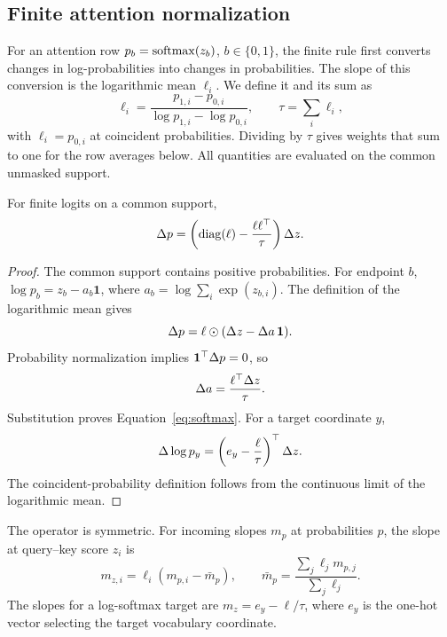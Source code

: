 \subsection{Finite attention normalization}
\label{app:softmax}
For an attention row $p_b=\operatorname{softmax}(z_b)$, $b\in\{0,1\}$, the finite rule first converts changes in log-probabilities into changes in probabilities. The slope of this conversion is the logarithmic mean $\ell_i$. We define it and its sum as
\begin{equation}
\ell_i=\frac{p_{1,i}-p_{0,i}}{\log p_{1,i}-\log p_{0,i}},\qquad
\tau=\sum_i\ell_i,
\label{eq:logmean}
\end{equation}
with $\ell_i=p_{0,i}$ at coincident probabilities. Dividing by $\tau$ gives weights that sum to one for the row averages below. All quantities are evaluated on the common unmasked support.
\begin{proposition}
For finite logits on a common support,
\begin{equation}
\Delta p=\left(\operatorname{diag}(\ell)-\frac{\ell\ell^\top}{\tau}\right)\Delta z.
\label{eq:softmax}
\end{equation}
\end{proposition}
\begin{proof}
The common support contains positive probabilities. For endpoint $b$, $\log p_b=z_b-a_b\mathbf 1$, where $a_b=\log\sum_i\exp(z_{b,i})$. The definition of the logarithmic mean gives
\begin{equation}
\Delta p=\ell\odot(\Delta z-\Delta a\,\mathbf 1).
\end{equation}
Probability normalization implies $\mathbf 1^\top\Delta p=0$, so
\begin{equation}
\Delta a=\frac{\ell^\top\Delta z}{\tau}.
\end{equation}
Substitution proves Equation~\ref{eq:softmax}. For a target coordinate $y$,
\begin{equation}
\Delta\log p_y=\left(e_y-\frac{\ell}{\tau}\right)^\top\Delta z.
\end{equation}
The coincident-probability definition follows from the continuous limit of the logarithmic mean.

\end{proof}
The operator is symmetric. For incoming slopes $m_p$ at probabilities $p$, the slope at query--key score $z_i$ is
\begin{equation}
m_{z,i}=\ell_i(m_{p,i}-\bar m_p),\qquad
\bar m_p=\frac{\sum_j\ell_j m_{p,j}}{\sum_j\ell_j}.
\label{eq:softmax-vjp}
\end{equation}
The slopes for a log-softmax target are $m_z=e_y-\ell/\tau$, where $e_y$ is the one-hot vector selecting the target vocabulary coordinate.

